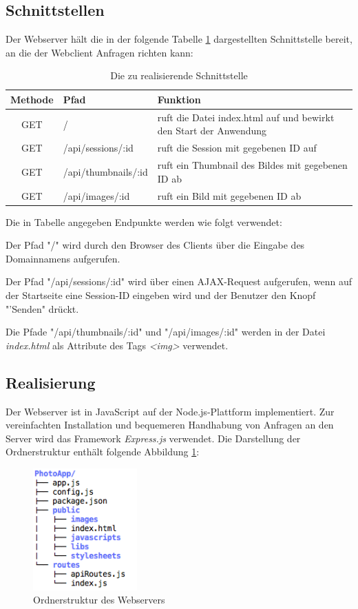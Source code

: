 \subsection{Schnittstellen}
Der Webserver hält die in der folgende Tabelle \ref{tab_api_routes} dargestellten Schnittstelle bereit, an die der Webclient 
Anfragen richten kann:
\begin{table}[h]
	\begin{center}
		\begin{tabularx}{\textwidth}{|c|l|X|}
			\hline
			\textbf{Methode} & \textbf{Pfad} & \textbf{Funktion}\\
			\hline
			GET & / & ruft die Datei index.html auf und bewirkt den Start der Anwendung \\
			\hline
			GET & /api/sessions/:id & ruft die Session mit gegebenen ID auf \\
			\hline
			GET & /api/thumbnails/:id & ruft ein Thumbnail des Bildes mit gegebenen ID ab \\
			\hline
			GET & /api/images/:id & ruft ein Bild mit gegebenen ID ab \\
			\hline
		\end{tabularx}
		\caption{Die zu realisierende Schnittstelle}
		\label{tab_api_routes}
	\end{center}
\end{table}

Die in Tabelle angegeben Endpunkte werden wie folgt verwendet:

Der Pfad "/"{} wird durch den Browser des Clients über die Eingabe des Domainnamens aufgerufen.

Der Pfad "/api/sessions/:id"{} wird über einen AJAX-Request aufgerufen, wenn auf der Startseite eine Session-ID 
eingeben wird und der Benutzer den Knopf  "'Senden" drückt.

Die Pfade "/api/thumbnails/:id"{} und "/api/images/:id"{} werden in der Datei \textit{index.html} als Attribute des Tags \textit{\textless img\textgreater} verwendet.

\subsection{Realisierung}
Der Webserver ist in JavaScript auf der Node.js-Plattform implementiert. Zur vereinfachten Installation und bequemeren Handhabung von Anfragen an den Server wird das Framework \textit{Express.js} verwendet. 
\clearpage
Die Darstellung der Ordnerstruktur enthält folgende Abbildung \ref{fig_struktur_webserver}:
\begin{figure}[h]
	\centering
	\includegraphics[width=4cm]{bilder/ordnerstruktur_photoapp}
	\caption{Ordnerstruktur des Webservers}
	\label{fig_struktur_webserver}
\end{figure}

